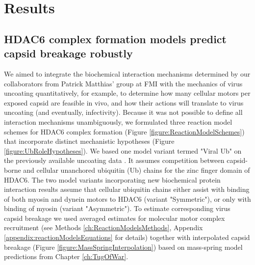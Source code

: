 \section{Results}

\subsection{HDAC6 complex formation models predict capsid breakage robustly}

We aimed to integrate the biochemical interaction mechanisms determined by our collaborators from Patrick Matthias' group at FMI with the mechanics of virus uncoating quantitatively, for example, to determine how many cellular motors per exposed capsid are feasible in vivo, and how their actions will translate to virus uncoating (and eventually, infectivity). Because it was not possible to define all interaction mechanisms unambiguously, we formulated three reaction model schemes for HDAC6 complex formation (Figure \ref{figure:ReactionModelSchemes}) that incorporate distinct mechanistic hypotheses (Figure \ref{figure:UbRoleHypotheses}). We based one model variant termed "Viral Ub" on the previously available uncoating data \cite{banerjee2014influenza}. It assumes competition between capsid-borne and cellular unanchored ubiquitin (Ub) chains for the zinc finger domain of HDAC6. The two model variants incorporating new biochemical protein interaction results assume that cellular ubiquitin chains either assist with binding of both myosin and dynein motors to HDAC6 (variant "Symmetric"), or only with binding of myosin (variant "Asymmetric"). To estimate corresponding virus capsid breakage we used averaged estimates for molecular motor complex recruitment (see Methods \ref{ch:ReactionModelsMethods}, Appendix \ref{appendix:reactionModelsEquations} for details) together with interpolated capsid breakage (Figure \ref{figure:MassSpringInterpolation}) based on mass-spring model predictions from Chapter \ref{ch:TugOfWar}.

